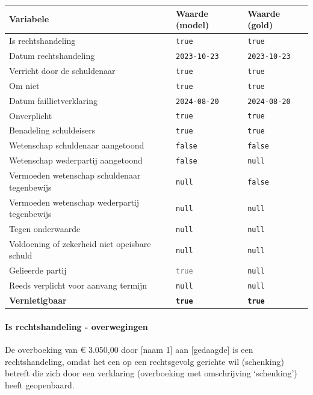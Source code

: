 \documentclass[
  dutch,
  a4paper,
]{article}
\begin{document}
\begin{center}
\small
\begin{tabular}{@{}p{7.4cm}p{2.6cm}p{2.6cm}@{}}
\toprule
Variabele & Waarde (model) & Waarde (gold) \\
\midrule
Is rechtshandeling & \texttt{true} & \texttt{true} \\
Datum rechtshandeling & \texttt{2023-10-23} & \texttt{2023-10-23} \\
Verricht door de schuldenaar & \texttt{true} & \texttt{true} \\
Om niet & \texttt{true} & \texttt{true} \\
Datum faillietverklaring & \texttt{2024-08-20} & \texttt{2024-08-20} \\
Onverplicht & \texttt{true} & \texttt{true} \\
Benadeling schuldeisers & \texttt{true} & \texttt{true} \\
Wetenschap schuldenaar aangetoond & \texttt{false} & \texttt{false} \\
Wetenschap wederpartij aangetoond & \texttt{false} & \texttt{null} \\
Vermoeden wetenschap schuldenaar tegenbewijs & \texttt{null} & \texttt{false} \\
Vermoeden wetenschap wederpartij tegenbewijs & \texttt{null} & \texttt{null} \\
Tegen onderwaarde & \texttt{null} & \texttt{null} \\
Voldoening of zekerheid niet opeisbare schuld & \texttt{null} & \texttt{null} \\
Gelieerde partij & \textcolor{gray}{\texttt{true}} & \texttt{null} \\
Reeds verplicht voor aanvang termijn & \texttt{null} & \texttt{null} \\
\textbf{Vernietigbaar} & \textbf{\texttt{true}} & \textbf{\texttt{true}} \\
\bottomrule
\end{tabular}
\end{center}

\paragraph{Is rechtshandeling - overwegingen}\label{is-rechtshandeling---overwegingen-27}

De overboeking van € 3.050,00 door {[}naam 1{]} aan {[}gedaagde{]} is een rechtshandeling, omdat het een op een rechtsgevolg gerichte wil (schenking) betreft die zich door een verklaring (overboeking met omschrijving `schenking') heeft geopenbaard.
\end{document}
